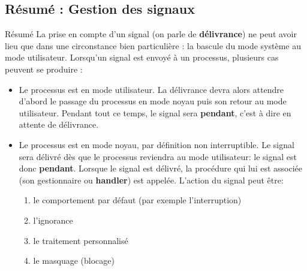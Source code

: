 \documentclass[9pt]{beamer}
\begin{document}
\subsection{Résumé : Gestion des signaux}
\begin{frame}{Résumé}
La prise en compte d'un signal (on parle de \textbf{délivrance}) ne peut avoir
lieu que dans une circonstance bien particulière : la bascule du mode
système au mode utilisateur. Lorsqu'un signal est envoyé à un processus,
plusieurs cas peuvent se produire :
\pause

\begin{itemize}
    \item<+->
    Le processus est en mode utilisateur. La délivrance devra alors
    attendre d'abord le passage du processus en mode noyau  puis son
    retour au mode utilisateur. Pendant tout ce temps, le signal sera
    \textbf{pendant}, c'est à dire en attente de délivrance.
    \item<+->
Le processus est en mode noyau, par définition non interruptible. Le
signal sera délivré dès que le processus reviendra au mode
utilisateur: le signal est donc \textbf{pendant}. Lorsque le signal est délivré, la procédure qui lui
est associée (son gestionnaire ou\textbf{ handler})  est appelée. L'action du signal peut être:
\begin{enumerate}
    \item  le comportement par défaut (par exemple l'interruption)
    \item l'ignorance
    \item le traitement personnalisé
    \item le masquage (blocage)
\end{enumerate}
\end{itemize}
\end{frame}
\end{document}
